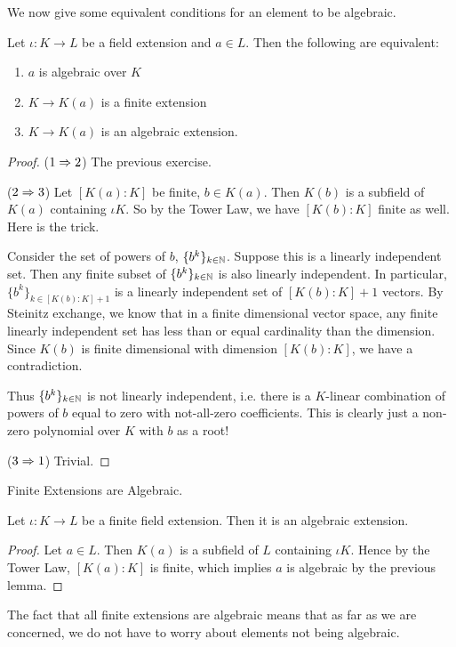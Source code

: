 \documentclass[../book.tex]{subfiles}
\begin{document}
We now give some equivalent conditions for an element to be algebraic.
\begin{lem}
    Let $\iota : K \to L$ be a field extension and $a \in L$. 
    Then the following are equivalent:
    \begin{enumerate}
        \item $a$ is algebraic over $K$
        \item $K \to K(a)$ is a finite extension
        \item $K \to K(a)$ is an algebraic extension.
    \end{enumerate}
\end{lem}
\begin{proof}
    ($1 \Rightarrow 2$)
        The previous exercise.
        
    ($2 \Rightarrow 3$)
        Let $[K(a):K]$ be finite, $b \in K(a)$.
        Then $K(b)$ is a subfield of $K(a)$ containing $\iota K$. 
        So by the Tower Law, we have $[K(b):K]$ finite as well.
        Here is the trick. 
        
        Consider the set of powers of $b$, $\{b^k\}_{k\in\mathbb{N}}$.
        Suppose this is a linearly independent set.
        Then any finite subset of $\{b^k\}_{k\in\mathbb{N}}$ is also linearly independent.
        In particular, $\{b^k\}_{k\in[K(b):K]+1}$ is a linearly independent set
        of $[K(b):K]+1$ vectors.
        By Steinitz exchange, we know that in a finite dimensional vector space, 
        any finite linearly independent set has less than or equal cardinality
        than the dimension. 
        Since $K(b)$ is finite dimensional with dimension $[K(b):K]$,
        we have a contradiction.
        
        Thus $\{b^k\}_{k\in\mathbb{N}}$ is not linearly independent, i.e.
        there is a $K$-linear combination of powers of $b$ equal to zero
        with not-all-zero coefficients.
        This is clearly just a non-zero polynomial over $K$ 
        with $b$ as a root!
        
    ($3 \Rightarrow 1$)
        Trivial.
\end{proof}
\begin{thm} Finite Extensions are Algebraic.

    Let $\iota : K \to L$ be a finite field extension. 
    Then it is an algebraic extension.
\end{thm}
\begin{proof}
    Let $a \in L$. Then $K(a)$ is a subfield of $L$ containing $\iota K$.
    Hence by the Tower Law, $[K(a) : K]$ is finite,
    which implies $a$ is algebraic by the previous lemma. 
\end{proof}
\begin{rmk}
    The fact that all finite extensions are algebraic means that
    as far as we are concerned, we do not have to worry about
    elements not being algebraic.
\end{rmk}
\end{document}
